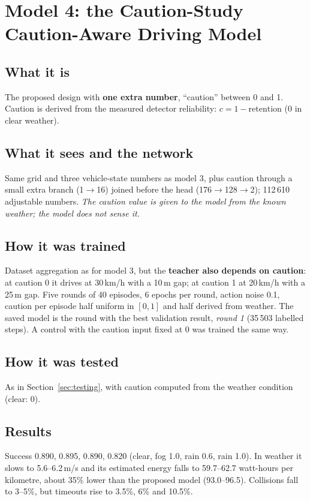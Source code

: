 \documentclass[11pt,a4paper]{article}
\begin{document}
\section{Model 4: the Caution-Study Caution-Aware Driving Model}
\subsection{What it is}
The proposed design with \textbf{one extra number}, ``caution'' between 0 and 1. Caution is derived from the measured detector reliability: $c=1-\text{retention}$ (0 in clear weather).
\subsection{What it sees and the network}
Same grid and three vehicle-state numbers as model 3, plus caution through a small extra branch (1$\to$16) joined before the head (176$\to$128$\to$2); 112\,610 adjustable numbers. \emph{The caution value is given to the model from the known weather; the model does not sense it.}
\subsection{How it was trained}
Dataset aggregation as for model 3, but the \textbf{teacher also depends on caution}: at caution 0 it drives at 30\,km/h with a 10\,m gap; at caution 1 at 20\,km/h with a 25\,m gap. Five rounds of 40 episodes, 6 epochs per round, action noise 0.1, caution per episode half uniform in $[0,1]$ and half derived from weather. The saved model is the round with the best validation result, \emph{round 1} (35\,503 labelled steps). A control with the caution input fixed at 0 was trained the same way.
\subsection{How it was tested}
As in Section~\ref{sec:testing}, with caution computed from the weather condition (clear: 0).
\subsection{Results}
Success 0.890, 0.895, 0.890, 0.820 (clear, fog 1.0, rain 0.6, rain 1.0). In weather it slows to 5.6--6.2\,m/s and its estimated energy falls to 59.7--62.7 watt-hours per kilometre, about 35\% lower than the proposed model (93.0--96.5). Collisions fall to 3--5\%, but timeouts rise to 3.5\%, 6\% and 10.5\%.
\end{document}
